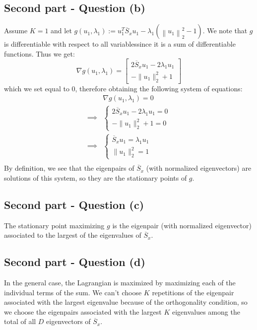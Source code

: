 \documentclass[12pt]{article}
\begin{document}
\subsection{Second part - Question (b)}
Assume \(K=1\) and let \(g\left(u_{1}, \lambda_{1}\right):=u_1^T \overline{S}_x u_1-\lambda_1 \left( \left\|u_1\right\|_2^2 - 1 \right)\). We note that \(g\) is differentiable with respect to all variablessince it is a sum of differentiable functions. Thus we get:
\[
    \nabla g (u_1, \lambda_1) =
    \begin{bmatrix}
        2\overline{S}_x u_1 - 2 \lambda_1 u_1 \\
        - \| u_1 \|_2^2 + 1
    \end{bmatrix}
\]
which we set equal to 0, therefore obtaining the following system of equations:
\begin{align*}
             & \nabla g (u_1, \lambda_1) = 0 \\
    \implies &
    \begin{cases}
        2\overline{S}_x u_1 - 2 \lambda_1 u_1 = 0 \\
        - \| u_1 \|_2^2 + 1 = 0
    \end{cases}               \\
    \implies &
    \begin{cases}
        \overline{S}_x u_1 = \lambda_1 u_1 \\
        \| u_1 \|_2^2 = 1
    \end{cases}               \\
\end{align*}
By definition, we see that the eigenpairs of \(\overline{S}_x\) (with normalized eigenvectors) are solutions of this system, so they are the stationary points of \(g\).

\subsection{Second part - Question (c)}
The stationary point maximizing \(g\) is the eigenpair (with normalized eigenvector) associated to the largest of the eigenvalues of \(\overline{S}_x\).

\subsection{Second part - Question (d)}
In the general case, the Lagrangian is maximized by maximizing each of the individual terms of the sum. We can't choose \(K\) repetitions of the eigenpair associated with the largest eigenvalue because of the orthogonality condition, so we choose the eigenpairs associated with the largest \(K\) eigenvalues among the total of all \(D\) eigenvectors of \(\overline{S}_x\).
\end{document}
